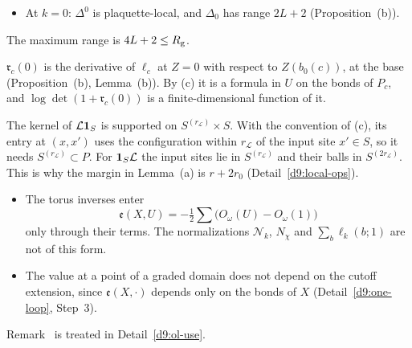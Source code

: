 \begin{detail}
\begin{step}
\begin{itemize}
\item At $k=0$: $\Delta^0$ is plaquette-local, and $\Delta_0$ has range $2L+2$ (Proposition~(b)).
\end{itemize}
The maximum range is $4L+2\le R_{\rm g}$.
\end{step}
\begin{step}[(d) Jacobians]
$\mathfrak r_c(0)$ is the derivative of $\ell_c$ at $Z=0$ with respect to $Z(b_0(c))$, at the base (Proposition~(b), Lemma~(b)). By (c) it is a formula in $U$ on the bonds of $P_c$, and $\log\det(1+\mathfrak r_c(0))$ is a finite-dimensional function of it.
\end{step}
\begin{step}
The kernel of $\mathcal L\mathbf 1_S$ is supported on $S^{(r_{\mathcal L})}\times S$. With the convention of (c), its entry at $(x,x')$ uses the configuration within $r_{\mathcal L}$ of the input site $x'\in S$, so it needs $S^{(r_{\mathcal L})}\subset P$. For $\mathbf 1_S\mathcal L$ the input sites lie in $S^{(r_{\mathcal L})}$ and their balls in $S^{(2r_{\mathcal L})}$. This is why the margin in Lemma~(a) is $r+2r_0$ (Detail~\ref{d9:local-ops}).
\end{step}
\end{detail}

\begin{detail}\label{d9:global}
\begin{itemize}
\item The torus inverses enter
\[
\mathfrak e(X,U)=-\tfrac12\sum\big(O_\omega(U)-O_\omega(1)\big)
\]
only through their terms. The normalizations $\mathcal N_k$, $N_\chi$ and $\sum_b\ell_k(b;1)$ are not of this form.
\item The value at a point of a graded domain does not depend on the cutoff extension, since $\mathfrak e(X,\cdot)$ depends only on the bonds of $X$ (Detail~\ref{d9:one-loop}, Step~3).
\end{itemize}
Remark~ is treated in Detail~\ref{d9:ol-use}.
\end{detail}

